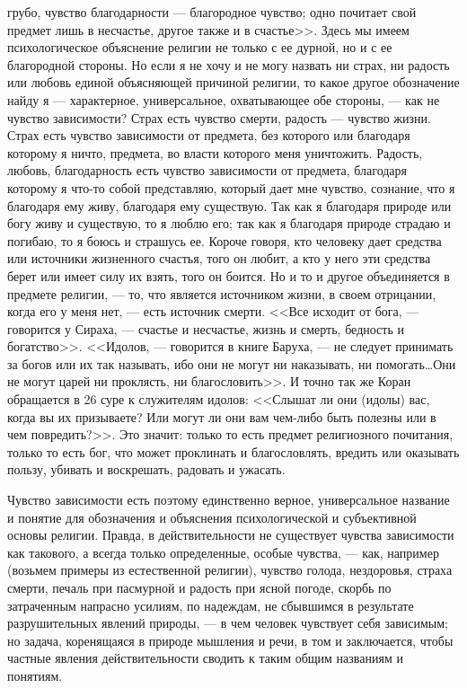 \documentclass[12pt]{article}
\begin{document}
грубо, чувство благодарности --- благородное чувство; одно почитает свой предмет лишь в несчастье, другое также и в счастье>>. Здесь мы имеем психологическое объяснение религии не только с ее дурной, но и с ее благородной стороны. Но если я не хочу и не могу назвать ни страх, ни радость или любовь единой объясняющей причиной религии, то какое другое обозначение найду я --- характерное, универсальное, охватывающее обе стороны, --- как не чувство зависимости? Страх есть чувство смерти, радость --- чувство жизни. Страх есть чувство зависимости от предмета, без которого или благодаря которому я ничто, предмета, во власти которого меня уничтожить. Радость, любовь, благодарность есть чувство зависимости от предмета, благодаря которому я что-то собой представляю, который дает мне чувство, сознание, что я благодаря ему живу, благодаря ему существую. Так как я благодаря природе или богу живу и существую, то я люблю его; так как я благодаря природе страдаю и погибаю, то я боюсь и страшусь ее. Короче говоря, кто человеку дает средства или источники жизненного счастья, того он любит, а кто у него эти средства берет или имеет силу их взять, того он боится. Но и то и другое объединяется в предмете религии, --- то, что является источником жизни, в своем отрицании, когда его у меня нет, --- есть источник смерти. <<Все исходит от бога, --- говорится у Сираха, --- счастье и несчастье, жизнь и смерть, бедность и богатство>>. <<Идолов, --- говорится в книге Баруха, --- не следует принимать за богов или их так называть, ибо они не могут ни наказывать, ни помогать\dots Они не могут царей ни проклясть, ни благословить>>. И точно так же Коран обращается в 26 суре к служителям идолов: <<Слышат ли они (идолы) вас, когда вы их призываете? Или могут ли они вам чем-либо быть полезны или в чем повредить?>>. Это значит: только то есть предмет религиозного почитания, только то есть бог, что может проклинать и благословлять, вредить или оказывать пользу, убивать и воскрешать, радовать и ужасать. 

Чувство зависимости есть поэтому единственно верное, универсальное название и понятие для обозначения и объяснения психологической и субъективной основы религии. Правда, в действительности не существует чувства зависимости как такового, а всегда только определенные, особые чувства, --- как, например (возьмем примеры из естественной религии), чувство голода, нездоровья, страха смерти, печаль при пасмурной и радость при ясной погоде, скорбь по затраченным напрасно усилиям, по надеждам, не сбывшимся в результате разрушительных явлений природы, --- в чем человек чувствует себя зависимым; но задача, коренящаяся в природе мышления и речи, в том и заключается, чтобы частные явления действительности сводить к таким общим названиям и понятиям. 
\end{document}
